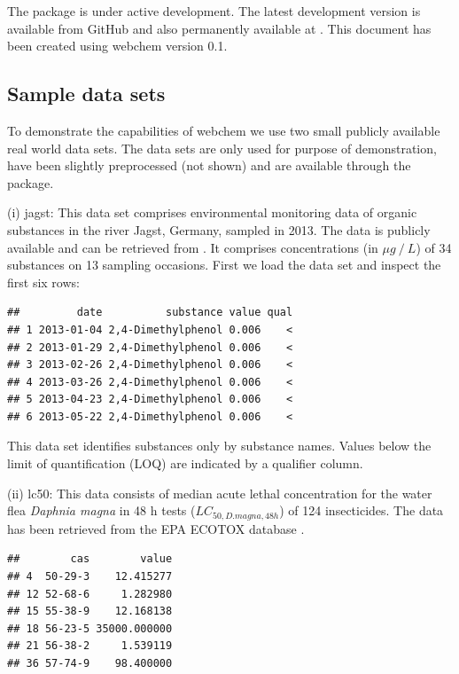 The package is under active development. The latest development version is available from GitHub and also permanently available at \citet{zenodo}.
This document has been created using webchem version 0.1.


\subsection[Sample data sets]{Sample data sets}
To demonstrate the capabilities of  webchem we use two small publicly available real world data sets.
The data sets are only used for purpose of demonstration, have been slightly preprocessed (not shown) and are available through the package.

(i) jagst: This data set comprises environmental monitoring data of organic substances in the river Jagst, Germany, sampled in 2013.
The data is publicly available and can be retrieved from \citet{lubw_2016}.
It comprises concentrations  (in $\mu g~/~L$) of  34 substances  on 13 sampling occasions.
First we load the data set and inspect the first six rows:

\begin{knitrout}
\color{fgcolor}\begin{kframe}
\begin{alltt}
\hlstd{(}\hlstd{)}
\end{alltt}
\begin{verbatim}
##         date          substance value qual
## 1 2013-01-04 2,4-Dimethylphenol 0.006    <
## 2 2013-01-29 2,4-Dimethylphenol 0.006    <
## 3 2013-02-26 2,4-Dimethylphenol 0.006    <
## 4 2013-03-26 2,4-Dimethylphenol 0.006    <
## 5 2013-04-23 2,4-Dimethylphenol 0.006    <
## 6 2013-05-22 2,4-Dimethylphenol 0.006    <
\end{verbatim}
\end{kframe}
\end{knitrout}

This data set identifies substances only by substance names. Values below the limit of quantification (LOQ) are indicated by a qualifier column.

(ii) lc50: This data consists of median acute lethal concentration for the water flea \textit{Daphnia magna} in 48 h tests ($LC_{50, D.magna, 48h}$) of 124 insecticides.
The data has been retrieved from the EPA ECOTOX database \citep{epa_2016}.

\begin{knitrout}
\color{fgcolor}\begin{kframe}
\begin{alltt}
\hlstd{(}\hlstd{)}
\end{alltt}
\begin{verbatim}
##        cas        value
## 4  50-29-3    12.415277
## 12 52-68-6     1.282980
## 15 55-38-9    12.168138
## 18 56-23-5 35000.000000
## 21 56-38-2     1.539119
## 36 57-74-9    98.400000
\end{verbatim}
\end{kframe}
\end{knitrout}

